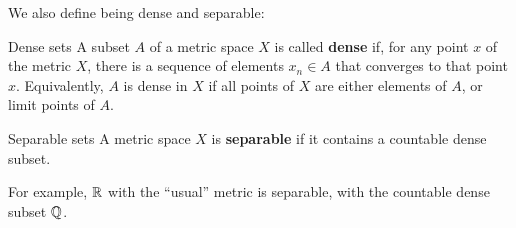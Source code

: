 We also define being dense and separable:

\begin{bdefin}{Dense sets}{}
A subset $A$ of a metric space $X$ is called \textbf{dense} if, for any point $x$ of the metric $X$, there is a sequence of elements $x_{n} \in A$ that converges to that point $x$. Equivalently, $A$ is dense in $X$ if all points of $X$ are either elements of $A$, or limit points of $A$.
\end{bdefin}

\begin{bdefin}{Separable sets}{}
A metric space $X$ is \textbf{separable} if it contains a countable dense subset.
\end{bdefin}
For example, $\mathbb{R}$ with the “usual” metric is separable, with the countable dense subset $\mathbb{Q}$.

